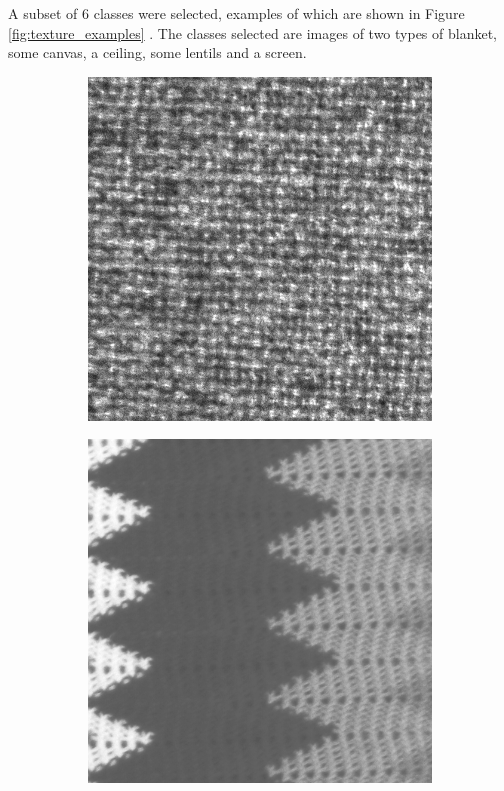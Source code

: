 A subset of 6 classes were selected,  examples of which are shown in Figure \ref{fig:texture_examples} .  The classes selected are images of two types of blanket, some canvas, a ceiling, some lentils and a screen.

\begin{figure}[h!]
\begin{subfigure}{.15\textwidth}
  \centering
  \includegraphics[width=.8\linewidth]{kylberg_examples/blanket1_001.png}
\end{subfigure}%
\begin{subfigure}{.15\textwidth}
  \centering
  \includegraphics[width=.8\linewidth]{kylberg_examples/blanket2_001.png}

\end{subfigure}
\end{figure}
